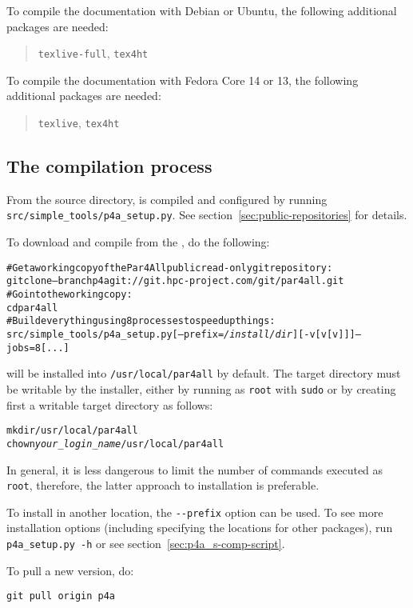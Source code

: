 \documentclass[a4paper]{article}
\begin{document}
To compile the documentation with Debian or Ubuntu, the following
additional packages are needed:
\begin{quote}
  \texttt{texlive-full}, \texttt{tex4ht}
\end{quote}

To compile the documentation with Fedora Core 14 or 13, the following
additional packages are needed:
\begin{quote}
  \texttt{texlive}, \texttt{tex4ht}
\end{quote}

\subsection{The compilation process}
\label{sec:compilation-process}

From the \Apfa source directory, \Apfa is compiled and configured
by running \verb|src/simple_tools/p4a_setup.py|. See
section~\ref{sec:public-repositories} for details.

To download and compile \Apfa from the \Agit, do the following:
\begin{alltt}
# Get a working copy of the Par4All public read-only git repository:
git clone --branch p4a git://git.hpc-project.com/git/par4all.git
# Go into the working copy:
cd par4all
# Build everything using 8 processes to speed up things:
src/simple_tools/p4a_setup.py [--prefix=\emph{/install/dir}] [-v[v[v]]] --jobs=8 [...]
\end{alltt}%
\Apfa will be installed into \verb|/usr/local/par4all| by default.
The target directory must be writable by the installer, either by running
as \texttt{root} with \texttt{sudo} or by creating first a
writable target directory as follows:
\begin{alltt}
mkdir /usr/local/par4all
chown \emph{your_login_name} /usr/local/par4all
\end{alltt}
In general, it is less dangerous to limit the number of commands
executed as \texttt{root}, therefore, the latter approach to \Apfa
installation is preferable.

To install in another location, the \verb|--prefix| option can be
used. To see more installation options (including specifying
the locations for other packages), run \verb|p4a_setup.py -h|
or see section~\ref{sec:p4a_s-comp-script}.

To pull a new version, do:
\begin{verbatim}
git pull origin p4a
\end{verbatim}
\end{document}
